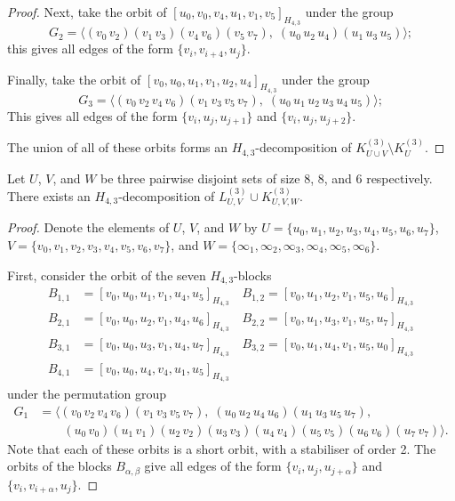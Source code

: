 \begin{subappendices}
\begin{proof}
Next, take the orbit of $[u_0, v_0, v_4, u_1, v_1, v_5]_{H_{4,3}}$ under the group
\[
    G_2 = \langle (v_0 \, v_2) (v_1 \, v_3) (v_4 \, v_6) (v_5 \, v_7), \;
    (u_0 \, u_2 \, u_4) (u_1 \, u_3 \, u_5) \rangle;
\]
this gives all edges of the form $\{v_i, v_{i+4}, u_j\}$.

Finally, take the orbit of $[v_0, u_0, u_1, v_1, u_2, u_4]_{H_{4,3}}$ under the group
\[
    G_3 = \langle (v_0 \, v_2 \, v_4 \, v_6) (v_1 \, v_3 \, v_5 \, v_7), \;
    (u_0 \, u_1 \, u_2 \, u_3 \, u_4 \, u_5) \rangle;
\]
This gives all edges of the form $\{v_i, u_j, u_{j+1}\}$ and $\{v_i, u_j, u_{j+2}\}$.

The union of all of these orbits forms an $H_{4,3}$-decomposition of $K_{U \cup
V}^{(3)} \setminus K_{U}^{(3)}$.
\end{proof}


\begin{example} \label{eg:H_43-l88-k886}
Let $U$, $V$, and $W$ be three pairwise disjoint sets of size 8, 8, and 6 respectively.
There exists an $H_{4,3}$-decomposition of $L_{U,V}^{(3)} \cup K_{U,V,W}^{(3)}$.
\end{example}

\begin{proof}
Denote the elements of $U$, $V$, and $W$ by $U = \{u_0, u_1, u_2, u_3, u_4, u_5, u_6, u_7\}$,
  $V = \{v_0, v_1, v_2, v_3, v_4, v_5, v_6, v_7\}$, and
  $W = \{\infty_1, \infty_2, \infty_3, \infty_4, \infty_5, \infty_6\}$.

First, consider the orbit of the seven $H_{4,3}$-blocks
\begin{align*}
    B_{1,1} &= [v_0, u_0, u_1, v_1, u_4, u_5]_{H_{4,3}} \quad
    B_{1,2} = [v_0, u_1, u_2, v_1, u_5, u_6]_{H_{4,3}} \\
    B_{2,1} &= [v_0, u_0, u_2, v_1, u_4, u_6]_{H_{4,3}} \quad
    B_{2,2} = [v_0, u_1, u_3, v_1, u_5, u_7]_{H_{4,3}} \\
    B_{3,1} &= [v_0, u_0, u_3, v_1, u_4, u_7]_{H_{4,3}} \quad
    B_{3,2} = [v_0, u_1, u_4, v_1, u_5, u_0]_{H_{4,3}} \\
    B_{4,1} &= [v_0, u_0, u_4, v_4, u_1, u_5]_{H_{4,3}}
\end{align*}
under the permutation group
\begin{align*}
    G_1 &= \langle (v_0 \, v_2 \, v_4 \, v_6) (v_1 \, v_3 \, v_5 \, v_7),
    \; (u_0 \, u_2 \, u_4 \, u_6) (u_1 \, u_3 \, u_5 \, u_7), \\
    & \quad \quad (u_0 \, v_0) (u_1 \, v_1) (u_2 \, v_2) (u_3 \, v_3) (u_4 \, v_4)
    (u_5 \, v_5) (u_6 \, v_6) (u_7 \, v_7) \rangle.
\end{align*}
Note that each of these orbits is a short orbit, with a stabiliser of order 2.
The orbits of the blocks $B_{\alpha,\beta}$ give all edges of the form $\{v_i, u_j, u_{j+\alpha}\}$ and $\{v_i, v_{i+\alpha}, u_j\}$.


\end{proof}
\end{subappendices}
